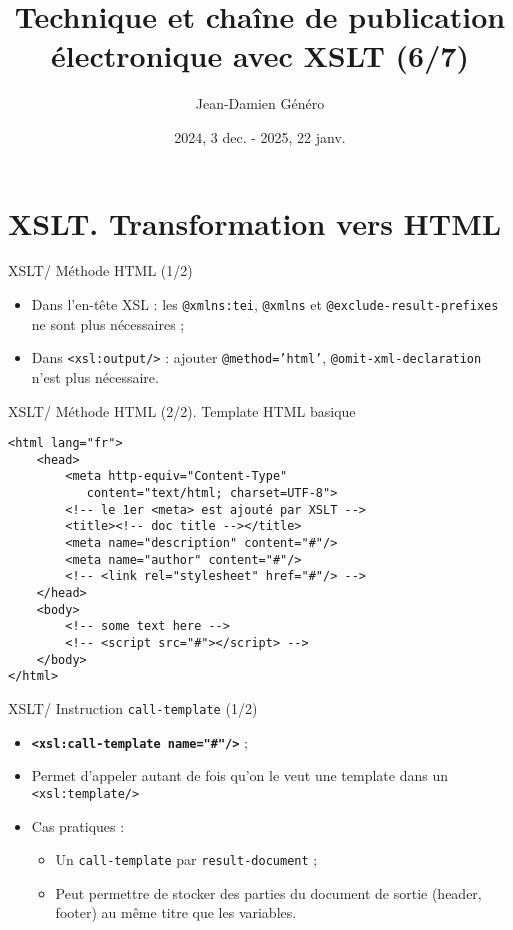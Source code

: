 \documentclass{beamer}
\title{Technique et chaîne de publication électronique avec XSLT (6/7)}
\date{2024, 3 dec. - 2025, 22 janv.}
\author{Jean-Damien Généro}
\institute{École nationale des chartes -- M2 TNAH}
\begin{document}
    \maketitle

    \section{XSLT. Transformation vers HTML}

    \begin{frame}{XSLT/ Méthode HTML (1/2)}
        \Large
        \begin{itemize}
            \item Dans l'en-tête XSL : les \texttt{@xmlns:tei}, \texttt{@xmlns} et \texttt{@exclude-result-prefixes} ne sont plus nécessaires ;
            \bigskip
            \item Dans \texttt{<xsl:output/>} : ajouter \texttt{@method='html'}, \texttt{@omit-xml-declaration} n'est plus nécessaire.
        \end{itemize}
    \end{frame}

    \begin{frame}[fragile]{XSLT/ Méthode HTML (2/2). Template HTML basique}
        \begin{verbatim}
<html lang="fr">
    <head>
        <meta http-equiv="Content-Type" 
           content="text/html; charset=UTF-8">
        <!-- le 1er <meta> est ajouté par XSLT -->
        <title><!-- doc title --></title>
        <meta name="description" content="#"/>
        <meta name="author" content="#"/>
        <!-- <link rel="stylesheet" href="#"/> -->
    </head>
    <body>
        <!-- some text here -->
        <!-- <script src="#"></script> -->
    </body>
</html>
        \end{verbatim}
    \end{frame}
    
    \begin{frame}{XSLT/ Instruction \texttt{call-template} (1/2)}
        \Large
        \begin{itemize}
            \item \textbf{\texttt{<xsl:call-template name="\#"/>}} ;
            \item Permet d'appeler autant de fois qu'on le veut une template dans un \texttt{<xsl:template/>}
            \item Cas pratiques :
            \begin{itemize}
            \Large
                \item Un \texttt{call-template} par \texttt{result-document} ;
                \item Peut permettre de stocker des parties du document de sortie (header, footer) au même titre que les variables.
            \end{itemize}
        \end{itemize}
    \end{frame}
\end{document}
